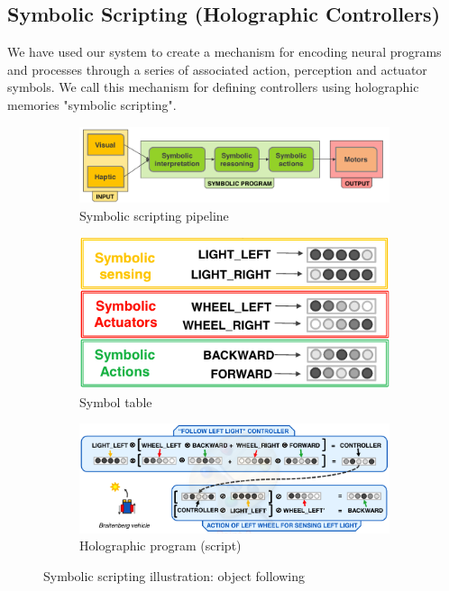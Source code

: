 \documentclass[a4paper,twoside]{article}
\begin{document}
	

		\label{fig:visual-scene-exp}
	
\subsection{Symbolic Scripting (Holographic Controllers)}

We have used our system to create a mechanism for encoding neural programs and processes through a series of associated action, perception and actuator symbols. We call this mechanism for defining controllers using holographic memories "symbolic scripting".


\begin{figure}[th!]
	\center
	\begin{subfigure}{1\columnwidth}
		\includegraphics[width=\columnwidth]{img/control_pipeline.png}
		\caption{Symbolic scripting pipeline}
		\label{fig:symbolic-scripting-a}
	\end{subfigure}
	
	
	\begin{subfigure}{0.7\columnwidth}
		\center
		\includegraphics[width=\columnwidth]{img/symbol_table.png}
		\caption{Symbol table}
		\label{fig:symbolic-scripting-b}
	\end{subfigure}
	\begin{subfigure}{1\columnwidth}
		\includegraphics[width=\columnwidth]{img/controller.png}
		\caption{Holographic program (script)}
		\label{fig:symbolic-scripting-c}
	\end{subfigure}
	\caption{Symbolic scripting illustration: object following}
	\label{fig:symbolic-scripting}
\end{figure}
\end{document}
